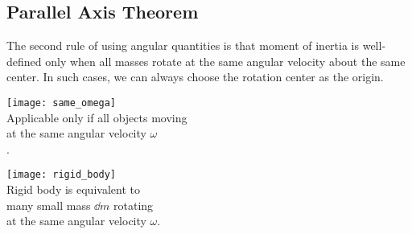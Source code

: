 \documentclass[class=article, crop=false, 12pt]{standalone}
\begin{document}
\subsection{Parallel Axis Theorem}

The second rule of using angular quantities is that moment of inertia is well-defined
only when all masses rotate at the same angular velocity about the same center.
In such cases, we can always choose the rotation center as the origin. 

\begin{center}
    \begin{minipage}{0.4\linewidth}
        \centering
        \texttt{[image: same\_omega]}\\
        Applicable only if all objects moving\\
        at the same angular velocity $\omega$\\
        .
    \end{minipage}
    \hspace{2em}
    \vline
    \hspace{2em}
    \begin{minipage}{0.4\linewidth}
        \centering
        \texttt{[image: rigid\_body]}\\
        Rigid body is equivalent to\\
        many small mass $\dd{m}$ rotating\\
        at the same angular velocity $\omega$.
    \end{minipage}
\end{center}
\end{document}
